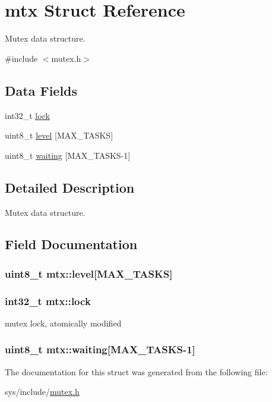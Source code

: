 \hypertarget{structmtx}{\section{mtx Struct Reference}
\label{structmtx}
}


Mutex data structure.  




{\ttfamily \#include $<$mutex.\-h$>$}

\subsection*{Data Fields}
\begin{DoxyCompactItemize}
\item 
int32\-\_\-t \hyperlink{structmtx_a5c9abfe5d985f974f920b19b94890f40}{lock}
\item 
uint8\-\_\-t \hyperlink{structmtx_ab13e9d09a96e18160571b960e4e7c1fb}{level} \mbox{[}M\-A\-X\-\_\-\-T\-A\-S\-K\-S\mbox{]}
\item 
uint8\-\_\-t \hyperlink{structmtx_ab86ca9283ce5f816d3700d0212662e04}{waiting} \mbox{[}M\-A\-X\-\_\-\-T\-A\-S\-K\-S-\/1\mbox{]}
\end{DoxyCompactItemize}


\subsection{Detailed Description}
Mutex data structure. 

\subsection{Field Documentation}
\hypertarget{structmtx_ab13e9d09a96e18160571b960e4e7c1fb}{
\subsubsection[{level}]{\setlength{\rightskip}{0pt plus 5cm}uint8\-\_\-t mtx\-::level\mbox{[}M\-A\-X\-\_\-\-T\-A\-S\-K\-S\mbox{]}}}\label{structmtx_ab13e9d09a96e18160571b960e4e7c1fb}
\hypertarget{structmtx_a5c9abfe5d985f974f920b19b94890f40}{
\subsubsection[{lock}]{\setlength{\rightskip}{0pt plus 5cm}int32\-\_\-t mtx\-::lock}}\label{structmtx_a5c9abfe5d985f974f920b19b94890f40}
mutex lock, atomically modified \hypertarget{structmtx_ab86ca9283ce5f816d3700d0212662e04}{
\subsubsection[{waiting}]{\setlength{\rightskip}{0pt plus 5cm}uint8\-\_\-t mtx\-::waiting\mbox{[}M\-A\-X\-\_\-\-T\-A\-S\-K\-S-\/1\mbox{]}}}\label{structmtx_ab86ca9283ce5f816d3700d0212662e04}


The documentation for this struct was generated from the following file\-:\begin{DoxyCompactItemize}
\item 
sys/include/\hyperlink{mutex_8h}{mutex.\-h}\end{DoxyCompactItemize}
